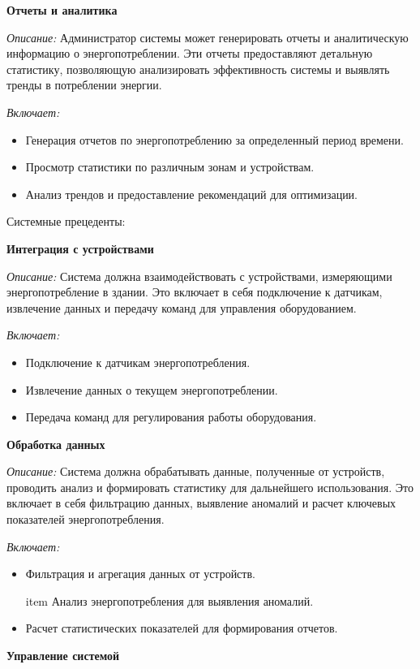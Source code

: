 {\textbf{Отчеты и аналитика}}

\textit{Описание:} Администратор системы может генерировать отчеты и аналитическую информацию о энергопотреблении. Эти отчеты предоставляют детальную статистику, позволяющую анализировать эффективность системы и выявлять тренды в потреблении энергии.

\textit{Включает:} 
\begin{itemize}
	\item Генерация отчетов по энергопотреблению за определенный период времени.
	\item Просмотр статистики по различным зонам и устройствам.
	\item Анализ трендов и предоставление рекомендаций для оптимизации.
\end{itemize}

{Системные прецеденты:}

{\textbf{Интеграция с устройствами}}

\textit{Описание:} Система должна взаимодействовать с устройствами, измеряющими энергопотребление в здании. Это включает в себя подключение к датчикам, извлечение данных и передачу команд для управления оборудованием.

\textit{Включает:} 
\begin{itemize}
	\item Подключение к датчикам энергопотребления.
	\item Извлечение данных о текущем энергопотреблении.
	\item Передача команд для регулирования работы оборудования.
\end{itemize}

{\textbf{Обработка данных}}

\textit{Описание:} Система должна обрабатывать данные, полученные от устройств, проводить анализ и формировать статистику для дальнейшего использования. Это включает в себя фильтрацию данных, выявление аномалий и расчет ключевых показателей энергопотребления.

\textit{Включает:} 
\begin{itemize}
	\item Фильтрация и агрегация данных от устройств.
	\
	
	item Анализ энергопотребления для выявления аномалий.
	\item Расчет статистических показателей для формирования отчетов.
\end{itemize}

{\textbf{Управление системой}}

